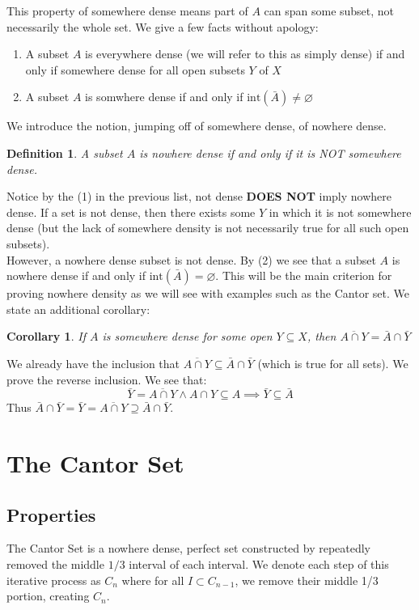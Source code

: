\documentclass{exam}
\newtheorem{defn}{Definition}[section]
\newtheorem{cor}{Corollary}[section]
\begin{document}
This property of somewhere dense means part of $A$ can span some subset, not necessarily the whole set. We give a few facts without apology:
\begin{enumerate}
  \item A subset $A$ is everywhere dense (we will refer to this as simply dense) if and only if somewhere dense for all open subsets $Y$ of $X$
  \item A subset $A$ is somwhere dense if and only if $\text{int}(\bar{A}) \neq \varnothing$
\end{enumerate}
We introduce the notion, jumping off of somewhere dense, of nowhere dense.
\begin{defn}
A subset $A$ is nowhere dense if and only if it is NOT somewhere dense.
\end{defn}
Notice by the (1) in the previous list, not dense \textbf{DOES NOT} imply nowhere dense. If a set is not dense, then there exists some $Y$ in which it is not somewhere dense (but the lack of somewhere density is not necessarily true for all such open subsets).\\

However, a nowhere dense subset is not dense. By (2) we see that a subset $A$ is nowhere dense if and only if $\text{int}(\bar{A}) = \varnothing$. This will be the main criterion for proving nowhere density as we will see with examples such as the Cantor set. We state an additional corollary:
\begin{cor}
If $A$ is somewhere dense for some open $Y \subseteq X$, then $\overline{A \cap Y} = \bar{A} \cap \bar{Y}$
\end{cor}
We already have the inclusion that $\overline{A \cap Y} \subseteq \bar{A} \cap \bar{Y}$ (which is true for all sets). We prove the reverse inclusion. We see that:
\begin{equation*}
  \bar{Y} = \overline{A \cap Y} \land A \cap Y \subseteq A \implies \bar{Y} \subseteq \bar{A} 
\end{equation*}
Thus $\bar{A} \cap \bar{Y} = \bar{Y} = \overline{A \cap Y} \supseteq \bar{A} \cap \bar{Y}$.

\section*{The Cantor Set}

\subsection*{Properties}
The Cantor Set is a nowhere dense, perfect set constructed by repeatedly removed the middle $1/3$ interval of each interval. We denote each step of this iterative process as $C_n$ where for all $I \subset C_{n-1}$, we remove their middle 1/3 portion, creating $C_n$.\\
\end{document}
